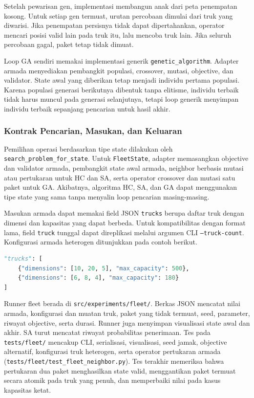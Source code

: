 Setelah pewarisan gen, implementasi membangun anak dari peta penempatan kosong. Untuk setiap gen termuat, urutan percobaan dimulai dari truk yang diwarisi. Jika penempatan persisnya tidak dapat dipertahankan, operator mencari posisi valid lain pada truk itu, lalu mencoba truk lain. Jika seluruh percobaan gagal, paket tetap tidak dimuat.

Loop GA sendiri memakai implementasi generik \texttt{genetic\_algorithm}. Adapter armada menyediakan pembangkit populasi, crossover, mutasi, objective, dan validator. State awal yang diberikan tetap menjadi individu pertama populasi. Karena populasi generasi berikutnya dibentuk tanpa elitisme, individu terbaik tidak harus muncul pada generasi selanjutnya, tetapi loop generik menyimpan individu terbaik sepanjang pencarian untuk hasil akhir.

\subsubsection{Kontrak Pencarian, Masukan, dan Keluaran}

Pemilihan operasi berdasarkan tipe state dilakukan oleh \texttt{search\_problem\_for\_state}. Untuk \texttt{FleetState}, adapter memasangkan objective dan validator armada, pembangkit state awal armada, neighbor berbasis mutasi atau pertukaran untuk HC dan SA, serta operator crossover dan mutasi satu paket untuk GA. Akibatnya, algoritma HC, SA, dan GA dapat menggunakan tipe state yang sama tanpa menyalin loop pencarian masing-masing.

Masukan armada dapat memakai field JSON \texttt{trucks} berupa daftar truk dengan dimensi dan kapasitas yang dapat berbeda. Untuk kompatibilitas dengan format lama, field \texttt{truck} tunggal dapat direplikasi melalui argumen CLI \texttt{--truck-count}. Konfigurasi armada heterogen ditunjukkan pada contoh berikut.

\begin{lstlisting}[language=Python, caption={Contoh konfigurasi truk heterogen dalam JSON},label={lst:fleet-json}]
"trucks": [
    {"dimensions": [10, 20, 5], "max_capacity": 500},
    {"dimensions": [6, 8, 4], "max_capacity": 180}
]
\end{lstlisting}

Runner fleet berada di \texttt{src/experiments/fleet/}. Berkas JSON mencatat nilai armada, konfigurasi dan muatan truk, paket yang tidak termuat, seed, parameter, riwayat objective, serta durasi. Runner juga menyimpan visualisasi state awal dan akhir. SA turut mencatat riwayat probabilitas penerimaan. Tes pada \texttt{tests/fleet/} mencakup CLI, serialisasi, visualisasi, seed jamak, objective alternatif, konfigurasi truk heterogen, serta operator pertukaran armada (\texttt{tests/fleet/test\_fleet\_neighbor.py}). Tes terakhir memeriksa bahwa pertukaran dua paket menghasilkan state valid, menggantikan paket termuat secara atomik pada truk yang penuh, dan memperbaiki nilai pada kasus kapasitas ketat.

